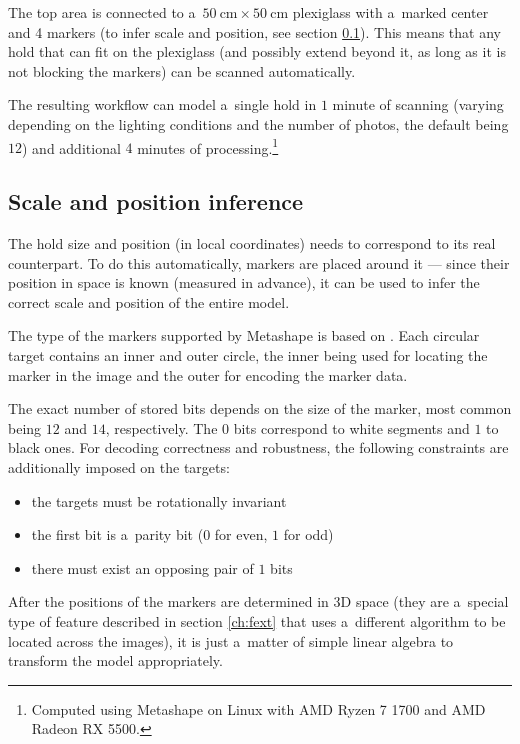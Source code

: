 The top area is connected to a~$\SI{50}{\centi\meter} \times \SI{50}{\centi\meter}$ plexiglass with a~marked center and 4 markers (to infer scale and position, see section \ref{sec:markersss}). This means that any hold that can fit on the plexiglass (and possibly extend beyond it, as long as it is not blocking the markers) can be scanned automatically.

The resulting workflow can model a~single hold in $1$ minute of scanning (varying depending on the lighting conditions and the number of photos, the default being $12$) and additional $4$ minutes of processing.\footnote{Computed using Metashape on Linux with AMD Ryzen 7 1700 and AMD Radeon RX 5500.}

\subsection{Scale and position inference}\label{sec:markersss}
The hold size and position (in local coordinates) needs to correspond to its real counterpart.
To do this automatically, markers are placed around it --- since their position in space is known (measured in advance), it can be used to infer the correct scale and position of the entire model.

The type of the markers supported by Metashape is based on \citet{schneider19913,borisPatent}.
Each circular target contains an inner and outer circle, the inner being used for locating the marker in the image and the outer for encoding the marker data.

The exact number of stored bits depends on the size of the marker, most common being $12$ and $14$, respectively.
The $0$ bits correspond to white segments and $1$ to black ones.
For decoding correctness and robustness, the following constraints are additionally imposed on the targets:

\begin{itemize}
	\item the targets must be rotationally invariant
	\item the first bit is a~parity bit ($0$ for even, $1$ for odd)
	\item there must exist an opposing pair of $1$ bits
\end{itemize}

After the positions of the markers are determined in 3D space (they are a~special type of feature described in section \ref{ch:fext} that uses a~different algorithm to be located across the images), it is just a~matter of simple linear algebra to transform the model appropriately.

